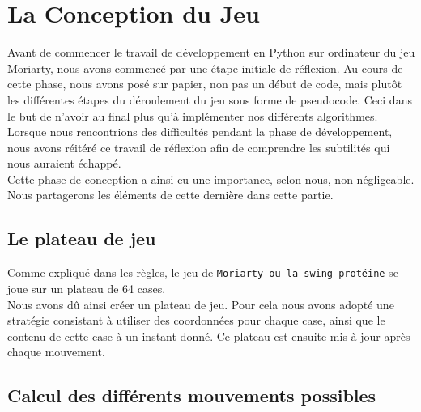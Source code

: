 \section{La Conception du Jeu}

Avant de commencer le travail de développement en Python sur ordinateur du jeu Moriarty, nous avons commencé par une étape initiale de réflexion. Au cours de cette phase, nous avons posé sur papier, non pas un début de code, mais plutôt les différentes étapes du déroulement du jeu sous forme de pseudocode. Ceci dans le but de n'avoir au final plus qu'à implémenter nos différents algorithmes.
\\Lorsque nous rencontrions des difficultés pendant la phase de développement, nous avons réitéré ce travail de réflexion afin de comprendre les subtilités qui nous auraient échappé.
\\Cette phase de conception a ainsi eu une importance, selon nous, non négligeable. Nous partagerons les éléments de cette dernière dans cette partie.

\subsection{Le plateau de jeu}

Comme expliqué dans les règles, le jeu de \verb|Moriarty ou la swing-protéine| se joue sur un plateau de 64 cases.
\\Nous avons dû ainsi créer un plateau de jeu. Pour cela nous avons adopté une stratégie consistant à utiliser des coordonnées pour chaque case, ainsi que le contenu de cette case à un instant donné. Ce plateau est ensuite mis à jour après chaque mouvement.

\subsection{Calcul des différents mouvements possibles}

